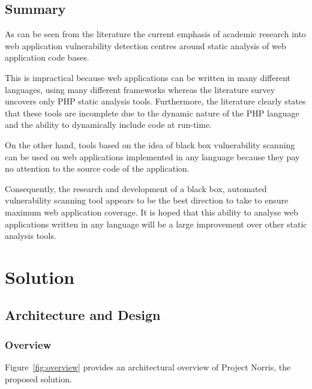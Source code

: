 \documentclass[12pt,a4paper]{article}
\begin{document}
\subsection{Summary}
As can be seen from the literature the current emphasis of academic research into web application vulnerability detection centres around static analysis of web application code bases.

This is impractical because web applications can be written in many different languages, using many different frameworks whereas the literature survey uncovers only PHP static analysis tools.  Furthermore, the literature clearly states that these tools are incomplete due to the dynamic nature of the PHP language and the ability to dynamically include code at run-time.

On the other hand, tools based on the idea of black box vulnerability scanning can be used on web applications implemented in any language because they pay no attention to the source code of the application.

Consequently, the research and development of a black box, automated vulnerability scanning tool appears to be the best direction to take to ensure maximum web application coverage.  It is hoped that this ability to analyse web applications written in any language will be a large improvement over other static analysis tools.

\section{Solution}

\subsection{Architecture and Design}

\subsubsection{Overview}
Figure~\ref{fig:overview} provides an architectural overview of Project Norris, the proposed solution.
\end{document}
